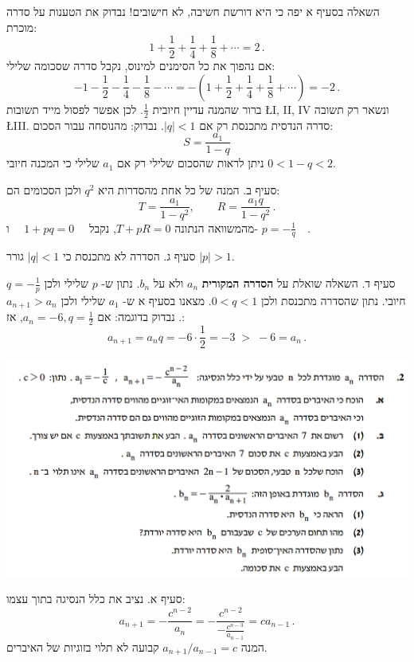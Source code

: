 \documentclass[12pt,a4paper]{article}
\begin{document}
השאלה בסעיף א יפה כי היא דורשת חשיבה, לא חישובים! נבדוק את הטענות על סדרה מוכרת:
\[
1+ \frac{1}{2} + \frac{1}{4} + \frac{1}{8} + \cdots = 2\,.
\]
אם נהפוך את כל הסימנים למינוס, נקבל סדרה שסכומה שלילי:
\[
-1 - \frac{1}{2} - \frac{1}{4} - \frac{1}{8} - \cdots = -\left(1+ \frac{1}{2} + \frac{1}{4} + \frac{1}{8} + \cdots\right) = -2\,.
\]
ברור שהמנה עדיין חיובית
$\frac{1}{2}$.
לכן אפשר לפסול מייד תשובות 
\L{I, II, IV}
ונשאר רק תשובה
\L{III}.
סדרה הנדסית מתכנסת רק אם
$|q|<1$.
נבדוק: מהנוסחה עבור הסכום:
\[
S = \frac{a_1}{1-q}
\]
ניתן לראות שהסכום שלילי רק אם 
$a_1$
שלילי כי המכנה חיובי
$0 < 1-q < 2$.

סעיף ב. המנה של כל אחת מהסדרות היא
$q^2$
ולכן הסכומים הם:
\[
T = \frac{a_1}{1-q^2},\quad\quad R = \frac{a_1q}{1-q^2}\,.
\]
מהמשוואה הנתונה
$T+pR=0$,
נקבל
$\quad 1+pq=0\quad$
ו-%
$p=-\displaystyle\frac{1}{q}\quad$.

סעיף ג. הסדרה לא מתכנסת כי 
$|q|<1$
גורר
$|p|>1$.

סעיף ד. השאלה שואלת על
\textbf{הסדרה המקורית}
$a_n$
ולא על 
$b_n$.
נתון ש-%
$p$
שלילי ולכן
$q=-\displaystyle\frac{1}{p}$
חיובי. נתון שהסדרה מתכנסת ולכן
$0<q<1$.
מצאנו בסעיף א ש-%
$a_1$
שלילי ולכן
$a_{n+1}>a_n$.
נבדוק בדוגמה: אם 
$a_n=-6,q=\frac{1}{2}$,
אז:
\[
a_{n+1} = a_nq = -6\cdot \frac{1}{2} = -3 \;> \; -6 =a_n\,.
\]


\textbf{}

\begin{center}
\includegraphics[width=\textwidth]{summer-2018b-2}
\end{center}
\vspace{-2ex}
סעיף א. נציב את כלל הנסיגה בתוך עצמו:
\[
a_{n+1} = -\frac{c^{n-2}}{a_n} = -\frac{c^{n-2}}{\displaystyle -\frac{c^{n-3}}{a_{n-1}}} = ca_{n-1}\,.
\]
המנה
$a_{n+1}/a_{n-1}=c$
קבועה לא תלוי בזוגיות של האיברים.
\end{document}
